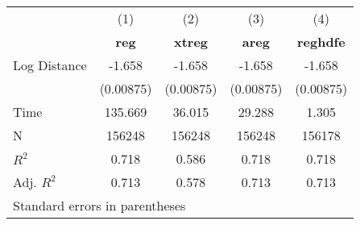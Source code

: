 \begin{tabular}{l*{4}{c}}
\hline\hline
                &\multicolumn{1}{c}{(1)}&\multicolumn{1}{c}{(2)}&\multicolumn{1}{c}{(3)}&\multicolumn{1}{c}{(4)}\\
                &\multicolumn{1}{c}{\textbf{reg}}&\multicolumn{1}{c}{\textbf{xtreg}}&\multicolumn{1}{c}{\textbf{areg}}&\multicolumn{1}{c}{\textbf{reghdfe}}\\
\hline
Log Distance    &   -1.658&   -1.658&   -1.658&   -1.658\\
                &(0.00875)&(0.00875)&(0.00875)&(0.00875)\\
\hline
Time            &  135.669&   36.015&   29.288&    1.305\\
N               &   156248&   156248&   156248&   156178\\
$ R^2$          &    0.718&    0.586&    0.718&    0.718\\
Adj. $ R^2$     &    0.713&    0.578&    0.713&    0.713\\
\hline\hline
\multicolumn{5}{l}{\footnotesize Standard errors in parentheses}\\
\end{tabular}
